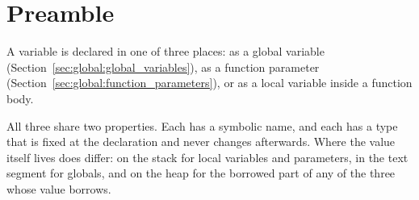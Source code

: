\section{Preamble}
\label{sec:memory:preamble}

A variable is declared in one of three places: as a global variable
(Section~\ref{sec:global:global_variables}), as a function parameter
(Section~\ref{sec:global:function_parameters}), or as a local variable inside a
function body.

All three share two properties. Each has a symbolic name, and each has a type
that is fixed at the declaration and never changes afterwards. Where the value
itself lives does differ: on the stack for local variables and parameters, in the
text segment for globals, and on the heap for the borrowed part of any of the
three whose value borrows.

